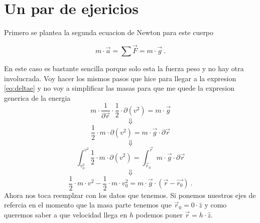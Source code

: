 \documentclass[../Main.tex]{subfiles}
\begin{document}
{\section{Un par de ejericios}



Primero se plantea la segunda ecuacion de Newton para este cuerpo

\begin{equation*}
    m \cdot \vec{a} = \sum \vec{F} = m \cdot \vec{g} \ .
\end{equation*}

}

\npage{
}
{

En este caso es bastante sencilla porque solo esta la fuerza peso y no hay otra
involucrada. Voy hacer los mismos pasos que hice para llegar a la expresion \ref{eq:deltae}
y no voy a simplificar las masas para que me quede la expresion generica de la
energia
\begin{equation*}
    m \cdot \frac{1}{\partial \vec{r}} \cdot \frac{1}{2} \cdot \partial \left( v^2 \right) = m \cdot \vec{g}
\end{equation*}
\begin{equation*}
    \Downarrow
\end{equation*}
\begin{equation*}
    \frac{1}{2} \cdot m \cdot \partial \left( v^2 \right) = m \cdot \vec{g} \cdot \partial \vec{r}
\end{equation*}
\begin{equation*}
    \Downarrow
\end{equation*}
\begin{equation*}
    \int_{v_0^2}^{v^2} \frac{1}{2} \cdot m \cdot \partial \left( v^2 \right) = \int_{\vec{r}_0}^{\vec{r}}m \cdot \vec{g} \cdot \partial \vec{r}
\end{equation*}
\begin{equation*}
    \Downarrow
\end{equation*}
\begin{equation*}
    \frac{1}{2} \cdot m \cdot v^2 - \frac{1}{2} \cdot m \cdot v_0^2 = m \cdot \vec{g} \cdot \left( \vec{r} - \vec{r_0} \right) \ .
\end{equation*}
Ahora nos toca reemplzar con los datos que tenemos. Si ponemos nuestros ejes de
refercia en el momento que la masa parte tenemos que $\vec{r}_0 = 0 \cdot \hat{z}$
y como queremos saber a que velocidad llega en $h$ podemos poner $\vec{r} = h \cdot \hat{z}$.
}
\end{document}
